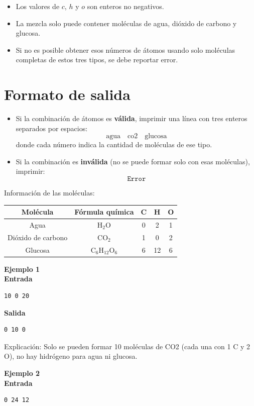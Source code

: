 \begin{itemize}
    \item Los valores de $c$, $h$ y $o$ son enteros no negativos.
    \item La mezcla solo puede contener moléculas de agua, dióxido de carbono y glucosa.
    \item Si no es posible obtener esos números de átomos usando solo moléculas completas de estos tres tipos, se debe reportar error.
\end{itemize}

\section*{Formato de salida}

\begin{itemize}
    \item Si la combinación de átomos es \textbf{válida}, imprimir una línea con tres enteros separados por espacios:
    \[
    \text{agua} \quad \text{co2} \quad \text{glucosa}
    \]
    donde cada número indica la cantidad de moléculas de ese tipo.
    \item Si la combinación es \textbf{inválida} (no se puede formar solo con esas moléculas), imprimir:
    \[
    \texttt{Error}
    \]
\end{itemize}

Información de las moléculas:\\

\begin{tabular}{|c|c|c|c|c|}
\hline
Molécula & Fórmula química & C & H & O \\
\hline
Agua & H$_2$O & 0 & 2 & 1 \\
Dióxido de carbono & CO$_2$ & 1 & 0 & 2 \\
Glucosa & C$_6$H$_{12}$O$_6$ & 6 & 12 & 6 \\
\hline
\end{tabular}

\textbf{Ejemplo 1}\\
\textbf{Entrada}
\begin{verbatim}
10 0 20
\end{verbatim}

\textbf{Salida}
\begin{verbatim}
0 10 0
\end{verbatim}
Explicación: Solo se pueden formar 10 moléculas de CO2 (cada una con 1 C y 2 O), no hay hidrógeno para agua ni glucosa.


\textbf{Ejemplo 2}\\
\textbf{Entrada}
\begin{verbatim}
0 24 12
\end{verbatim}


